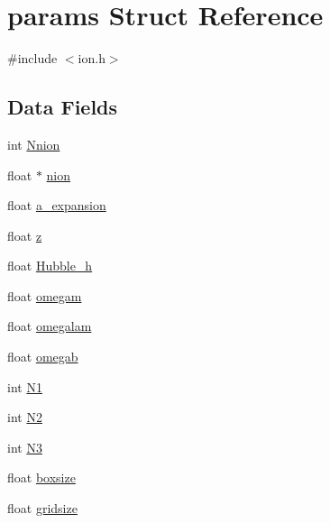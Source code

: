 \hypertarget{structparams}{\section{params Struct Reference}
\label{structparams}
}


{\ttfamily \#include $<$ion.\+h$>$}

\subsection*{Data Fields}
\begin{DoxyCompactItemize}
\item 
int \hyperlink{structparams_ab6d8d0b2c7ee385271e90e51818623bc}{Nnion}
\item 
float $\ast$ \hyperlink{structparams_ad55bc1e5d127b88c3b3bdf08ce83e026}{nion}
\item 
float \hyperlink{structparams_ab8ae1614d88a1fdcded37c8573053e9c}{a\+\_\+expansion}
\item 
float \hyperlink{structparams_af73583b1e980b0aa03f9884812e9fd4d}{z}
\item 
float \hyperlink{structparams_a341cbdda601613d5625f64bb60871f69}{Hubble\+\_\+h}
\item 
float \hyperlink{structparams_a1143ccc333b13b81d68f112fc1122acd}{omegam}
\item 
float \hyperlink{structparams_ac99cfe381d57df39c2cdb6d5c8f6f548}{omegalam}
\item 
float \hyperlink{structparams_aeaccd726adbb20f37e40458f9fc1789c}{omegab}
\item 
int \hyperlink{structparams_a5a6a26e0827f9640d2eb7201017f19d7}{N1}
\item 
int \hyperlink{structparams_adeea8075a0038c985c63d45161804d60}{N2}
\item 
int \hyperlink{structparams_a4e8e9c2bf9e06ae07ef364c05a073302}{N3}
\item 
float \hyperlink{structparams_aec8643d101b2d4269bd09101195acde9}{boxsize}
\item 
float \hyperlink{structparams_a6d64c764749c83c38277585af5854d89}{gridsize}
\end{DoxyCompactItemize}


